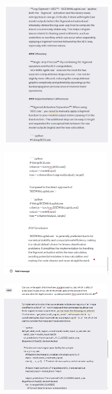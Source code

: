 \documentclass{article}
\begin{document}
\begin{figure}[H]
    \centering
    \includegraphics[width=0.5\textwidth]{report_data/g-11.png}
\end{figure}

\begin{figure}[H]
    \centering
    \includegraphics[width=0.5\textwidth]{report_data/g-12.png}
\end{figure}

\begin{figure}[H]
    \centering
    \includegraphics[width=0.5\textwidth]{report_data/g-13.png}

\end{figure}
\end{document}
